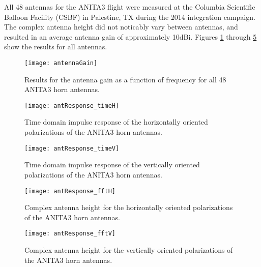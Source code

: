		All 48 antennas for the ANITA3 flight were measured at the Columbia Scientific Balloon Facility (CSBF) in Palestine, TX during the 2014 integration campaign.  The complex antenna height did not noticably vary between antennas, and resulted in an average antenna gain of approximately 10dBi.  Figures \ref{fig:antennaGain} through \ref{fig:antResponse_fftV} show the results for all antennas.
		

\begin{figure}
\centering
	\texttt{[image: antennaGain]}
	\caption{Results for the antenna gain as a function of frequency for all 48 ANITA3 horn antennas.}
\label{fig:antennaGain}
\end{figure}

\begin{figure}
\centering
	\texttt{[image: antResponse\_timeH]}
	\caption{Time domain impulse response of the horizontally oriented polarizations of the ANITA3 horn antennas.}
\label{fig:antResponse_timeH}
\end{figure}

\begin{figure}
\centering
	\texttt{[image: antResponse\_timeV]}
	\caption{Time domain impulse response of the vertically oriented polarizations of the ANITA3 horn antennas.}
\label{fig:antResponse_timeV}
\end{figure}

\begin{figure}
\centering
	\texttt{[image: antResponse\_fftH]}
	\caption{Complex antenna height for the horizontally oriented polarizations of the ANITA3 horn antennas.}
\label{fig:antResponse_fftH}
\end{figure}

\begin{figure}
\centering
	\texttt{[image: antResponse\_fftV]}
	\caption{Complex antenna height for the vertically oriented polarizations of the ANITA3 horn antennas.}
\label{fig:antResponse_fftV}
\end{figure}





